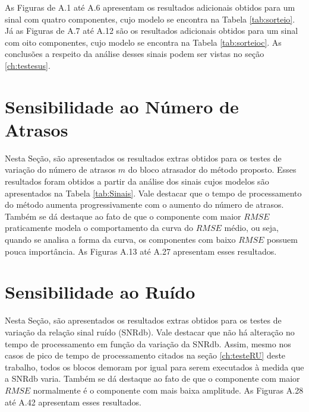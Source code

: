 \documentclass[a4paper,12pt]{monografia}
\theoremstyle{plain}
\theoremstyle{definition}
\theoremstyle{remark}
\begin{document}
As Figuras de A.1 até A.6 apresentam os resultados adicionais obtidos para um sinal com quatro componentes, cujo modelo se encontra na Tabela \ref{tab:sorteio}. Já as Figuras de A.7 até A.12 são os resultados adicionais obtidos para um sinal com oito componentes, cujo modelo se encontra na Tabela \ref{tab:sorteioc}. As conclusões a respeito da análise desses sinais podem ser vistas no seção \ref{ch:testesus}.

\section{Sensibilidade ao Número de Atrasos}

Nesta Seção, são apresentados os resultados extras obtidos para os testes de variação do número de atrasos $m$ do bloco atrasador do método proposto. Esses resultados foram obtidos a partir da análise dos sinais cujos modelos são apresentados na Tabela \ref{tab:Sinais}. Vale destacar que o tempo de processamento do método aumenta progressivamente com o aumento do número de atrasos.
Também se dá destaque ao fato de que o componente com maior $RMSE$ praticamente modela o comportamento da curva do $RMSE$ médio, ou seja, quando se analisa a forma da curva, os componentes com baixo $RMSE$ possuem pouca importância. As Figuras A.13 até A.27 apresentam esses resultados.

\section{Sensibilidade ao Ruído}

Nesta Seção, são apresentados os resultados extras obtidos para os testes de variação da relação sinal ruído (SNRdb). Vale destacar que não há alteração no tempo de processamento em função da variação da SNRdb. Assim, mesmo nos casos de pico de tempo de processamento citados na seção \ref{ch:testeRU} deste trabalho, todos os blocos demoram por igual para serem executados à medida que a SNRdb varia.
Também se dá destaque ao fato de que o componente com maior $RMSE$ normalmente é o componente com mais baixa amplitude. As Figuras A.28 até A.42 apresentam esses resultados.
\end{document}
